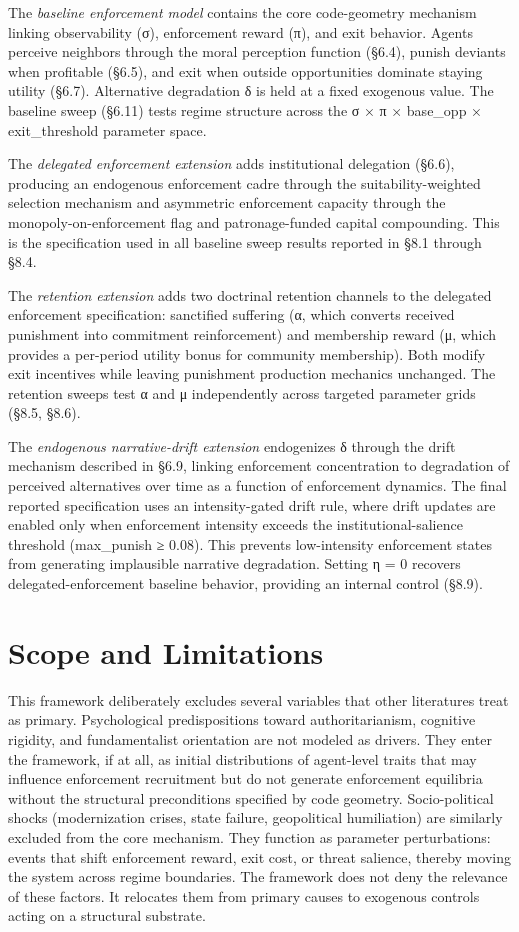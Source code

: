 \documentclass[12pt]{article}
\begin{document}
The \emph{baseline enforcement model} contains the core code-geometry mechanism linking observability (σ), enforcement reward (π), and exit behavior. Agents perceive neighbors through the moral perception function (§6.4), punish deviants when profitable (§6.5), and exit when outside opportunities dominate staying utility (§6.7). Alternative degradation δ is held at a fixed exogenous value. The baseline sweep (§6.11) tests regime structure across the σ × π × base\_opp × exit\_threshold parameter space.

The \emph{delegated enforcement extension} adds institutional delegation (§6.6), producing an endogenous enforcement cadre through the suitability-weighted selection mechanism and asymmetric enforcement capacity through the monopoly-on-enforcement flag and patronage-funded capital compounding. This is the specification used in all baseline sweep results reported in §8.1 through §8.4.

The \emph{retention extension} adds two doctrinal retention channels to the delegated enforcement specification: sanctified suffering (α, which converts received punishment into commitment reinforcement) and membership reward (μ, which provides a per-period utility bonus for community membership). Both modify exit incentives while leaving punishment production mechanics unchanged. The retention sweeps test α and μ independently across targeted parameter grids (§8.5, §8.6).

The \emph{endogenous narrative-drift extension} endogenizes δ through the drift mechanism described in §6.9, linking enforcement concentration to degradation of perceived alternatives over time as a function of enforcement dynamics. The final reported specification uses an intensity-gated drift rule, where drift updates are enabled only when enforcement intensity exceeds the institutional-salience threshold (max\_punish ≥ 0.08). This prevents low-intensity enforcement states from generating implausible narrative degradation. Setting η = 0 recovers delegated-enforcement baseline behavior, providing an internal control (§8.9).

%
\section{Scope and Limitations}

This framework deliberately excludes several variables that other literatures treat as primary. Psychological predispositions toward authoritarianism, cognitive rigidity, and fundamentalist orientation are not modeled as drivers. They enter the framework, if at all, as initial distributions of agent-level traits that may influence enforcement recruitment but do not generate enforcement equilibria without the structural preconditions specified by code geometry. Socio-political shocks (modernization crises, state failure, geopolitical humiliation) are similarly excluded from the core mechanism. They function as parameter perturbations: events that shift enforcement reward, exit cost, or threat salience, thereby moving the system across regime boundaries. The framework does not deny the relevance of these factors. It relocates them from primary causes to exogenous controls acting on a structural substrate.
\end{document}
